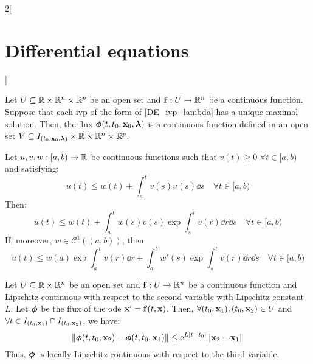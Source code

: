 \documentclass[../../../main.tex]{subfiles}
\begin{document}
\begin{multicols}{2}[\section{Differential equations}]
\begin{theorem}
    Let $U\subseteq\mathbb{R}\times\mathbb{R}^n\times\mathbb{R}^p$ be an open set and $\boldsymbol{\mathrm{f}}:U\rightarrow\mathbb{R}^n$ be a continuous function. Suppose that each ivp of the form of \eqref{DE_ivp_lambda} has a unique maximal solution. Then, the flux $\boldsymbol{\mathrm{\phi}}(t,t_0,\boldsymbol{\mathrm{x}}_0,\boldsymbol{\mathrm{\lambda}})$ is a continuous function defined in an open set $V\subseteq I_{(t_0,\boldsymbol{\mathrm{x}}_0,\boldsymbol{\mathrm{\lambda}})}\times\mathbb{R}\times\mathbb{R}^n\times\mathbb{R}^p$.
  \end{theorem}
  \begin{lemma}
    Let $u,v,w:[a,b)\rightarrow\mathbb{R}$ be continuous functions such that $v(t)\geq 0$ $\forall t\in[a,b)$ and satisfying: $$u(t)\leq w(t)+\int_a^tv(s)u(s)\dd s\quad\forall t\in[a,b)$$
    Then: $$u(t)\leq w(t)+\int_a^tw(s)v(s)\exp{\int_s^tv(r)\dd r}\dd s\quad\forall t\in[a,b)$$
    If, moreover, $w\in\mathcal{C}^1((a,b))$, then: $$u(t)\leq w(a)\exp{\int_a^tv(r)\dd r}+\int_a^tw'(s)\exp{\int_s^tv(r)\dd r}\dd s\quad\forall t\in[a,b)$$
  \end{lemma}
  \begin{prop}
    Let $U\subseteq\mathbb{R}\times\mathbb{R}^n$ be an open set and $\boldsymbol{\mathrm{f}}:U\rightarrow\mathbb{R}^n$ be a continuous function and Lipschitz continuous with respect to the second variable with Lipschitz constant $L$. Let $\boldsymbol{\mathrm{\phi}}$ be the flux of the ode $\boldsymbol{\mathrm{x}}'=\boldsymbol{\mathrm{f}}(t,\boldsymbol{\mathrm{x}})$. Then, $\forall (t_0,\boldsymbol{\mathrm{x}}_1),(t_0,\boldsymbol{\mathrm{x}}_2)\in U$ and $\forall t\in I_{(t_0,\boldsymbol{\mathrm{x}}_1)}\cap I_{(t_0,\boldsymbol{\mathrm{x}}_2)}$, we have:
    $$\|\boldsymbol{\mathrm{\phi}}(t,t_0,\boldsymbol{\mathrm{x}}_2)-\boldsymbol{\mathrm{\phi}}(t,t_0,\boldsymbol{\mathrm{x}}_1)\|\leq\mathrm{e}^{L|t-t_0|}\|\boldsymbol{\mathrm{x}}_2-\boldsymbol{\mathrm{x}}_1\|$$
    Thus, $\boldsymbol{\mathrm{\phi}}$ is locally Lipschitz continuous with respect to the third variable.
  \end{prop}

\end{multicols}
\end{document}

